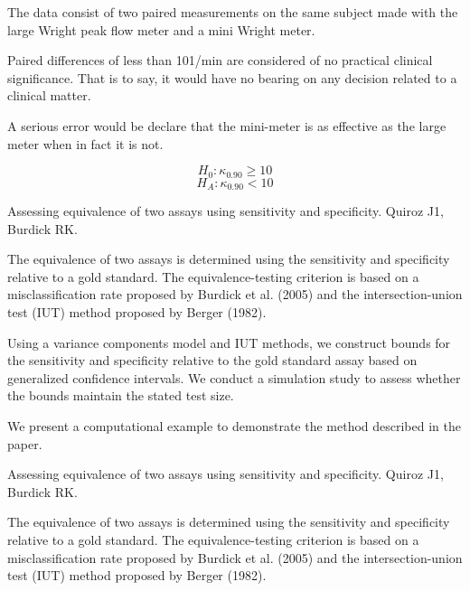 The data consist of two paired measurements on the same subject made with the large Wright peak flow meter and a mini
Wright meter.

Paired differences of less than 101/min are considered of no practical clinical significance. That is to say, it would have no bearing on
any decision related to a clinical matter.

A serious error would be declare that the mini-meter is as effective as the large meter when in fact it is not.


\[ H_0 : \kappa_{0.90} \geq 10 \]
\[ H_A : \kappa_{0.90} < 10 \]



\newpage

Assessing equivalence of two assays using sensitivity and specificity.
Quiroz J1, Burdick RK.


The equivalence of two assays is determined using the sensitivity and specificity relative to a gold standard.
The equivalence-testing criterion is based on a misclassification rate proposed by Burdick et al. (2005) and
the intersection-union test (IUT) method proposed by Berger (1982). 

Using a variance components model and IUT methods, we construct bounds for the sensitivity and specificity 
relative to the gold standard assay based on generalized confidence intervals. We conduct a simulation study 
to assess whether the bounds maintain the stated test size. 

We present a computational example to demonstrate the method described in the paper.

Assessing equivalence of two assays using sensitivity and specificity.
Quiroz J1, Burdick RK.


The equivalence of two assays is determined using the sensitivity and specificity relative to a gold standard.
The equivalence-testing criterion is based on a misclassification rate proposed by Burdick et al. (2005) and
the intersection-union test (IUT) method proposed by Berger (1982). 

